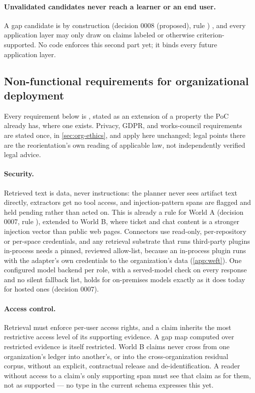 \paragraph{Unvalidated candidates never reach a learner or an end user.}
A gap candidate is  by construction (decision 0008 (proposed), rule
) \evobs, and every application layer may only draw on claims
labeled  or otherwise criterion-supported. \evfut{} No code enforces
this second part yet; it binds every future application layer.

\subsection{Non-functional requirements for organizational deployment}
\label{sec:platform-nfr}

Every requirement below is \evfut{}, stated as an extension of a property the PoC already has,
where one exists. Privacy, GDPR, and works-council requirements are stated once, in
\cref{sec:org-ethics}, and apply here unchanged; legal points there are the reorientation's own
reading of applicable law, not independently verified legal advice.

\paragraph{Security.}
Retrieved text is data, never instructions: the planner never sees artifact text directly,
extractors get no tool access, and injection-pattern spans are flagged and held pending rather
than acted on. This is already a rule for World A (decision 0007, rule
), extended to World B, where ticket and chat content is a stronger
injection vector than public web pages. Connectors use read-only, per-repository or per-space credentials, and any retrieval
substrate that runs third-party plugins in-process needs a pinned, reviewed allow-list, because an
in-process plugin runs with the adapter's own credentials to the organization's data
(\cref{app:weft}). One configured model backend per role, with a served-model check on every
response and no silent fallback list, holds for on-premises models exactly as it does today for
hosted ones (decision 0007).

\paragraph{Access control.}
Retrieval must enforce per-user access rights, and a claim inherits the most restrictive access
level of its supporting evidence. A gap map computed over restricted evidence is itself
restricted. World B claims never cross from one organization's ledger into another's, or into the
cross-organization residual corpus, without an explicit, contractual release and
de-identification. A reader without access to a claim's only supporting span must see that claim
as  for them, not as supported --- no type in the current schema expresses this yet.

